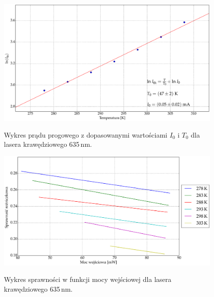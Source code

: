 \begin{figure}
\center
  \includegraphics[scale=0.30]{plot635/plot_temp_i_th_fit.eps}
  \label{rys2}
  \caption{Wykres prądu progowego z dopasowanymi wartościami $I_{0}$ i $T_{0}$ dla lasera krawędziowego 635\,nm.}
\end{figure}
\begin{figure}
\center
  \includegraphics[scale=0.30]{plot635/plot_eff_via_power.eps}
  \label{rys3}
  \caption{Wykres sprawności w funkcji mocy wejściowej dla lasera krawędziowego 635\,nm.}
\end{figure}
